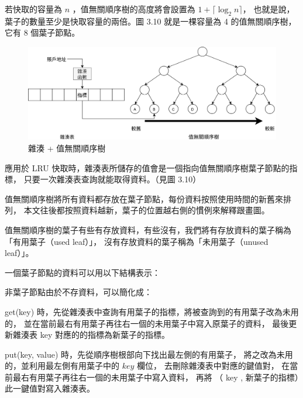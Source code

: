 若快取的容量為 $n$ ，值無關順序樹的高度將會設置為 $1 + \lceil \log_2 n \rceil$，
也就是說，葉子的數量至少是快取容量的兩倍。圖 3.10 就是一棵容量為 4 的值無關順序樹，它有 8 個葉子節點。

\begin{figure}[ht]
\includegraphics[width=\textwidth]{雜湊順序樹}
\caption{雜湊 + 值無關順序樹}
\end{figure}

應用於 LRU 快取時，雜湊表所儲存的值會是一個指向值無關順序樹葉子節點的指標，
只要一次雜湊表查詢就能取得資料。（見圖 3.10）

值無關順序樹將所有資料都存放在葉子節點，每份資料按照使用時間的新舊來排列，
本文往後都按照資料越新，葉子的位置越右側的慣例來解釋跟畫圖。

值無關順序樹的葉子有些有存放資料，有些沒有，我們將有存放資料的葉子稱為「有用葉子（used leaf）」，
沒有存放資料的葉子稱為「未用葉子（unused leaf）」。

一個葉子節點的資料可以用以下結構表示：

\begin{algorithm}[H]
\end{algorithm}

非葉子節點由於不存資料，可以簡化成：

\begin{algorithm}[H]
\end{algorithm}

get(key) 時，先從雜湊表中查詢有用葉子的指標，將被查詢到的有用葉子改為未用的，
並在當前最右有用葉子再往右一個的未用葉子中寫入原葉子的資料，
最後更新雜湊表 key 對應的的指標為新葉子的指標。

put(key, value) 時，先從順序樹根部向下找出最左側的有用葉子，
將之改為未用的，並利用最左側有用葉子中的 $key$ 欄位，
去刪除雜湊表中對應的鍵值對，
在當前最右有用葉子再往右一個的未用葉子中寫入資料，
再將 （ key , 新葉子的指標）此一鍵值對寫入雜湊表。


